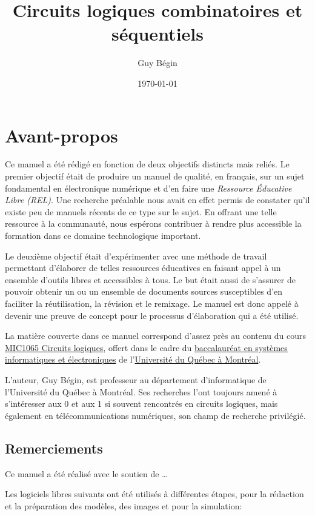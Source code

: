 \documentclass[11pt]{article}
\author{Guy Bégin}
\date{\today}
\title{Circuits logiques combinatoires et séquentiels}
\begin{document}
\maketitle

\section*{Avant-propos}
\label{sec:org12b7324}
Ce manuel a été rédigé en fonction de deux objectifs distincts mais
reliés. Le premier objectif était de produire un manuel de qualité, en
français, sur un sujet fondamental en électronique numérique et d'en
faire une \emph{Ressource Éducative Libre (REL)}. Une recherche préalable
nous avait en effet permis de constater qu'il existe peu de manuels
récents de ce type sur le sujet. En offrant une telle ressource à la
communauté, nous espérons contribuer à rendre plus accessible la
formation dans ce domaine technologique important.

Le deuxième objectif était d'expérimenter avec une méthode de
travail permettant d'élaborer de telles ressources éducatives en
faisant appel à un ensemble d'outils libres et accessibles à tous. Le
but était aussi de s'assurer de pouvoir obtenir un ou un ensemble de
documents sources susceptibles d'en faciliter la réutilisation, la
révision et le remixage. Le manuel est donc appelé à devenir une
preuve de concept pour le processus d'élaboration qui a été utilisé.

La matière couverte dans ce manuel correspond d'assez près au contenu
du cours \href{https://etudier.uqam.ca/cours?sigle=MIC1065}{MIC1065 Circuits logiques}, offert dans le cadre du
\href{https://etudier.uqam.ca/programme?code=6526}{baccalauréat en systèmes informatiques et électroniques} de
l'\href{https://uqam.ca/}{Université du Québec à Montréal}. 

L'auteur, Guy Bégin, est professeur au département d'informatique de
l'Université du Québec à Montréal. Ses recherches l'ont toujours amené
à s'intéresser aux 0 et aux 1 si souvent rencontrés en circuits
logiques, mais également en télécommunications numériques, son champ
de recherche privilégié.

\subsection*{Remerciements}
\label{sec:orge63952e}

Ce manuel a été réalisé avec le soutien de \ldots{}

Les logiciels libres suivants ont été utilisés à différentes étapes,
pour la rédaction et la préparation des modèles, des images et pour la
simulation:
\end{document}
